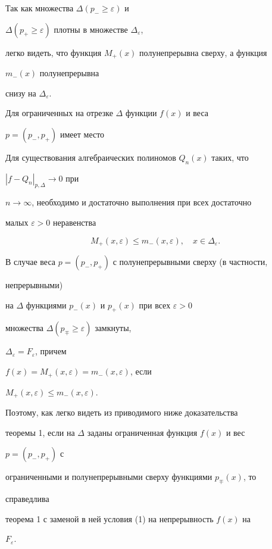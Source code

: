 Так как множества $\Delta(p_-\ge\varepsilon)$ и


$\Delta(p_+\ge\varepsilon)$ плотны в множестве $\Delta_\varepsilon$,


легко видеть, что функция $M_+(x)$ полунепрерывна сверху, а функция


$m_-(x)$ полунепрерывна


снизу на $\Delta_\varepsilon$.





Для ограниченных на отрезке $\Delta$ функции $f(x)$ и веса


$p=(p_-,p_+)$ имеет место





\begin{thm}


Для существования алгебраических полиномов $Q_n(x)$ таких, что


$|f-Q_n|_{p,\Delta}\to 0$ при


$n\to\infty$, необходимо и достаточно выполнения при всех достаточно


малых $\varepsilon>0$ неравенства


\begin{equation}


M_+(x,\varepsilon)\le m_-(x,\varepsilon),\quad


x\in\Delta_\varepsilon.


\end{equation}


\end{thm}





\begin{notenonum}


В случае веса $p=(p_-,p_+)$ с полунепрерывными сверху (в частности,


непрерывными)


на $\Delta$ функциями $p_-(x)$ и $p_+(x)$ при всех $\varepsilon>0$


множества $\Delta(p_\mp\ge\varepsilon)$ замкнуты,


$\Delta_\varepsilon=F_\varepsilon$, причем


$f(x)=M_+(x,\varepsilon)=m_-(x,\varepsilon)$, если


$M_+(x,\varepsilon)\le m_-(x,\varepsilon)$.





Поэтому, как легко видеть из приводимого ниже доказательства


теоремы 1, если на $\Delta$ заданы ограниченная функция $f(x)$ и вес


$p=(p_-,p_+)$ с


ограниченными и полунепрерывными сверху функциями $p_\mp(x)$, то


справедлива


теорема 1 с заменой в ней условия (1) на непрерывность $f(x)$ на


$F_\varepsilon$.


\end{notenonum}





